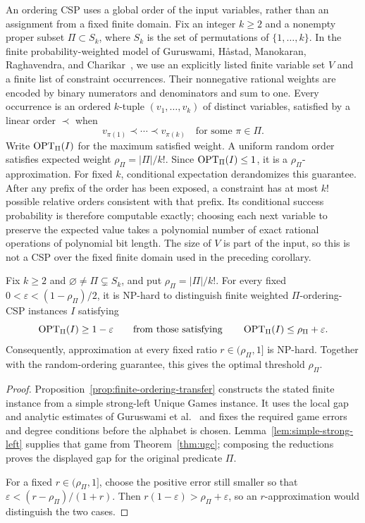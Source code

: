 An ordering CSP uses a global order of the input variables, rather than
an assignment from a fixed finite domain. Fix an integer \(k\ge2\) and
a nonempty proper subset \(\Pi\subset S_k\), where \(S_k\) is the set
of permutations of \(\{1,\ldots,k\}\). In the finite
probability-weighted model of Guruswami, H\aa stad, Manokaran,
Raghavendra, and Charikar~\cite[Definition~8.2]{GuruswamiEtAl2011OrderingCSP},
we use an explicitly listed finite variable set \(V\) and a finite list of
constraint occurrences. Their nonnegative rational weights are encoded
by binary numerators and denominators and sum to one. Every occurrence is an
ordered \(k\)-tuple \((v_1,\ldots,v_k)\) of distinct variables,
satisfied by a linear order \(\prec\) when
\[
 v_{\pi(1)}\prec\cdots\prec v_{\pi(k)}
 \quad\text{for some }\pi\in\Pi.
\]
Write \(\operatorname{OPT}_\Pi(I)\) for the maximum satisfied weight. A uniform
random order satisfies expected weight \(\rho_\Pi=|\Pi|/k!\).
Since \(\operatorname{OPT}_\Pi(I)\le1\), it is a \(\rho_\Pi\)-approximation.
For fixed \(k\), conditional expectation derandomizes this guarantee.
After any prefix of the order has been exposed, a constraint has at
most \(k!\) possible relative orders consistent with that prefix.
Its conditional success probability is therefore computable exactly;
choosing each next variable to preserve the expected value takes a
polynomial number of exact rational operations of polynomial bit length.
The size of \(V\) is part
of the input, so this is not a CSP over the fixed finite domain used
in the preceding corollary.

\begin{corollary}\label{cor:ordering-csp}
Fix \(k\ge2\) and \(\varnothing\ne\Pi\subsetneq S_k\), and put
\(\rho_\Pi=|\Pi|/k!\). For every fixed
\(0<\varepsilon<(1-\rho_\Pi)/2\), it is NP-hard to distinguish finite
weighted \(\Pi\)-ordering-CSP instances \(I\) satisfying
\[
 \operatorname{OPT}_\Pi(I)\ge1-\varepsilon
 \qquad\text{from those satisfying}\qquad
 \operatorname{OPT}_\Pi(I)\le\rho_\Pi+\varepsilon.
\]
Consequently, approximation at every fixed ratio
\(r\in(\rho_\Pi,1]\) is NP-hard. Together with the random-ordering
guarantee, this gives the optimal threshold \(\rho_\Pi\).
\end{corollary}
\begin{proof}
Proposition~\ref{prop:finite-ordering-transfer} constructs the stated
finite instance from a simple strong-left Unique Games instance. It
uses the local gap and analytic estimates of
Guruswami et al.~\cite{GuruswamiEtAl2011OrderingCSP} and fixes the
required game errors and degree conditions before the alphabet is
chosen. Lemma~\ref{lem:simple-strong-left} supplies that game from
Theorem~\ref{thm:ugc}; composing the reductions proves the displayed
gap for the original predicate \(\Pi\).

For a fixed \(r\in(\rho_\Pi,1]\), choose the positive error still
smaller so that \(\varepsilon<(r-\rho_\Pi)/(1+r)\). Then
\(r(1-\varepsilon)>\rho_\Pi+\varepsilon\), so an
\(r\)-approximation would distinguish the two cases.
\end{proof}


